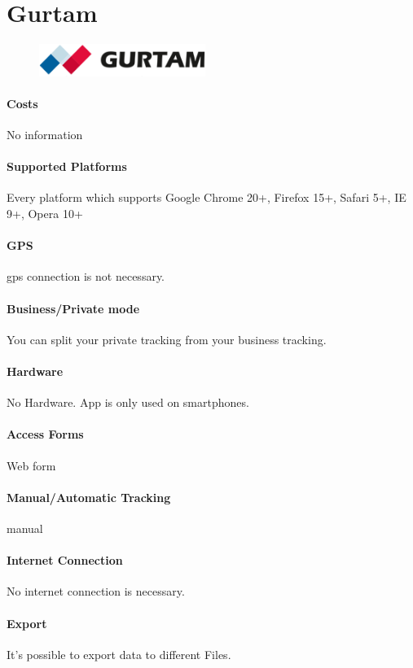 \section{Gurtam}
\begin{figure}
  \begin{center}
    \includegraphics[width=0.48\textwidth]{bilder/gurtam}
  \end{center}
\end{figure}
\paragraph{Costs} No information 
\paragraph{Supported Platforms} Every platform which supports  Google Chrome 20+, Firefox 15+, Safari 5+, IE 9+, Opera 10+
\paragraph{GPS} \gls{gps} connection is not necessary.
\paragraph{Business/Private mode} You can split your private tracking from your business tracking.
\paragraph{Hardware}No Hardware. App is only used on smartphones.
\paragraph{Access Forms}Web form
\paragraph{Manual/Automatic Tracking}manual
\paragraph{Internet Connection}No internet connection is necessary.
\paragraph{Export}It’s possible to export data to different Files.
